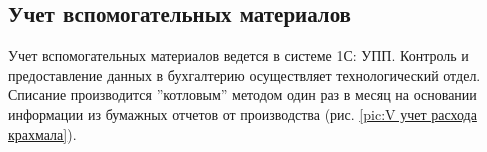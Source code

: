 




\subsection{Учет вспомогательных материалов}

Учет вспомогательных материалов ведется в системе 1С: УПП. Контроль и предоставление данных в бухгалтерию осуществляет технологический отдел. Списание производится ''котловым'' методом один раз в месяц на  основании информации из бумажных отчетов от производства (рис. \ref{pic:V учет расхода крахмала}).



